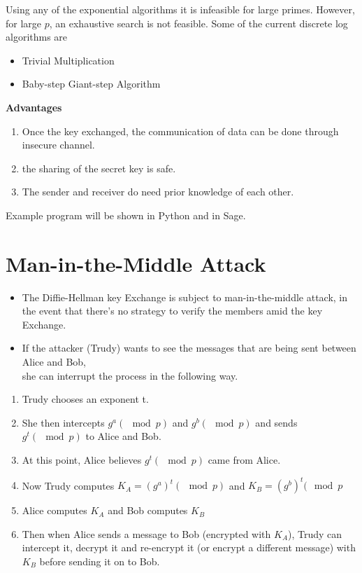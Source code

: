 \documentclass[12pt]{article}
\begin{document}
      Using any of the exponential algorithms it is infeasible for large primes.
       However, for large $p$, an exhaustive search is not feasible. 
         Some of the current discrete log algorithms are
         \begin{itemize}
         \item Trivial Multiplication
         \item Baby-step Giant-step Algorithm
          \end{itemize}
           \textbf{Advantages}
    \begin{enumerate}
        \item Once the key exchanged, the communication of data can be done through insecure channel.
        \item the sharing of the secret key is safe.
        \item The sender and receiver do need prior knowledge of each other.
     \end{enumerate}
     
     \text Example program will be shown in Python and in Sage.
     
     \chapter{Man-in-the-Middle Attack}
     \begin{itemize}
			        \item The Diffie-Hellman key Exchange is subject to man-in-the-middle attack, in the event that there's no strategy to verify the members amid the key Exchange.\\
			        \item If the attacker (Trudy) wants to see the messages that are being sent between Alice and Bob,\\
			        she can interrupt the process in the following way.
			    \end{itemize}
		
   \begin{enumerate}
           \item Trudy chooses an exponent t. \\
           \item She then intercepts $g^a (\mod p)$ and $g^b (\mod{p})$ and sends $g^t (\mod {p})$ to Alice and Bob.\\
           \item At this point, Alice believes $g^t(\mod{p})$ came from Alice.\\
           \item Now Trudy computes $K_A = (g^a)^t (\mod {p})$ and $K_B = (g^b)^t (\mod {p}$
           \item Alice computes $K_A$ and Bob computes $K_B$
           \item Then when Alice sends a message to Bob (encrypted with $K_A$), Trudy can intercept it, decrypt it and re-encrypt it (or encrypt a different message) with $K_B$ before sending it on to Bob. 
       \end{enumerate}
       
\end{document}
